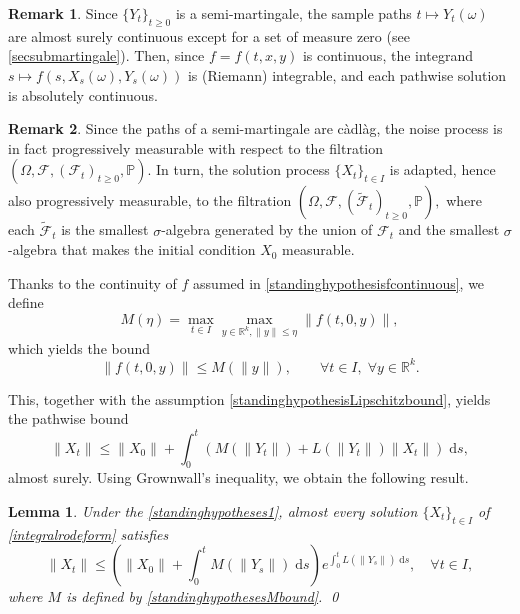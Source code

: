 \documentclass[reqno,12pt]{amsart}
\theoremstyle{plain} %
\newtheorem{lemma}{Lemma}[section]
\theoremstyle{definition} %
\newtheorem{remark}{Remark}[section]
\begin{document}
\begin{remark}
    Since $\{Y_t\}_{t\geq 0}$ is a semi-martingale, the sample paths $t \mapsto Y_t(\omega)$ are almost surely continuous except for a set of measure zero (see \cref{secsubmartingale}). Then, since $f=f(t, x, y)$ is continuous, the integrand $s \mapsto f(s, X_s(\omega), Y_s(\omega))$ is (Riemann) integrable, and each pathwise solution is absolutely continuous.
\end{remark}

\begin{remark}
    Since the paths of a semi-martingale are c\`adl\`ag, the noise process is in fact progressively measurable with respect to the filtration $(\Omega, \mathcal{F}, (\mathcal{F}_t)_{t\geq 0}, \mathbb{P}).$ In turn, the solution process $\{X_t\}_{t\in I}$ is adapted, hence also progressively measurable, to the filtration $(\Omega, \mathcal{F}, (\tilde{\mathcal{F}}_t)_{t\geq 0}, \mathbb{P}),$ where each $\tilde{\mathcal{F}}_t$ is the smallest $\sigma$-algebra generated by the union of $\mathcal{F}_t$ and the smallest $\sigma$-algebra that makes the initial condition $X_0$ measurable.
\end{remark}

Thanks to the continuity of $f$ assumed in \eqref{standinghypothesisfcontinuous}, we define
\begin{equation}
    \label{standinghypothesesMbound}
    M(\eta) = \max_{t\in I} \max_{y\in \mathbb{R}^k, \|y\|\leq \eta} \|f(t, 0, y)\|,
\end{equation}
which yields the bound
\[
    \|f(t, 0, y)\| \leq M(\|y\|), \qquad \forall t\in I, \;\forall y\in\mathbb{R}^k.
\]

This, together with the assumption \eqref{standinghypothesisLipschitzbound}, yields the pathwise bound
\[
    \|X_t\| \leq \|X_0\| + \int_0^t \left(M(\|Y_t\|) + L(\|Y_t\|)\|X_t\|\right)\;\mathrm{d}s,
\]
almost surely. Using Grownwall's inequality, we obtain the following result.
\begin{lemma}
    Under the \cref{standinghypotheses1}, almost every solution $\{X_t\}_{t\in I}$ of \eqref{integralrodeform} satisfies
    \begin{equation}
        \label{XtboundLXMt}
        \|X_t\| \leq \left(\|X_0\| + \int_0^t M(\|Y_s\|)\;\mathrm{d}s\right) e^{\int_0^t L(\|Y_s\|)\;\mathrm{d}s}, \quad \forall t\in I,
    \end{equation}
    where $M$ is defined by \eqref{standinghypothesesMbound}.
    \qed
\end{lemma}
\end{document}
